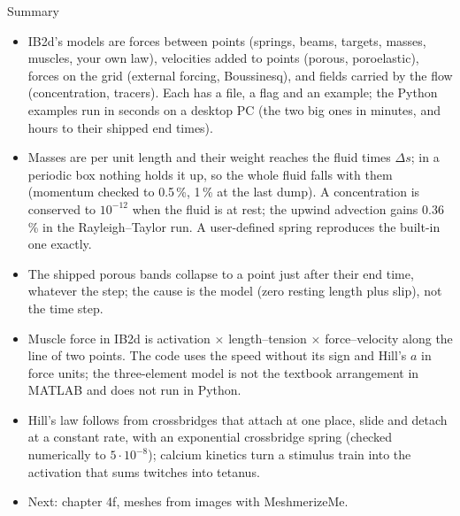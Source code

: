 \documentclass[aspectratio=169,11pt]{beamer}
\begin{document}
\begin{frame}{Summary}
\label{fr:summary}
\footnotesize
\begin{itemize}
  \item IB2d's models are forces between points (springs, beams, targets, masses, muscles, your own law), velocities added to points (porous, poroelastic), forces on the grid (external forcing, Boussinesq), and fields carried by the flow (concentration, tracers). Each has a file, a flag and an example; the Python examples run in seconds on a desktop PC (the two big ones in minutes, and hours to their shipped end times).
  \item Masses are per unit length and their weight reaches the fluid times $\Delta s$; in a periodic box nothing holds it up, so the whole fluid falls with them (momentum checked to 0.5\,\%, 1\,\% at the last dump). A concentration is conserved to $10^{-12}$ when the fluid is at rest; the upwind advection gains 0.36\,\% in the Rayleigh--Taylor run. A user-defined spring reproduces the built-in one exactly.
  \item The shipped porous bands collapse to a point just after their end time, whatever the step; the cause is the model (zero resting length plus slip), not the time step.
  \item Muscle force in IB2d is activation $\times$ length--tension $\times$ force--velocity along the line of two points. The code uses the speed without its sign and Hill's $a$ in force units; the three-element model is not the textbook arrangement in MATLAB and does not run in Python.
  \item Hill's law follows from crossbridges that attach at one place, slide and detach at a constant rate, with an exponential crossbridge spring (checked numerically to $5 \cdot 10^{-8}$); calcium kinetics turn a stimulus train into the activation that sums twitches into tetanus.
  \item Next: chapter 4f, meshes from images with MeshmerizeMe.
\end{itemize}
\end{frame}
\end{document}
